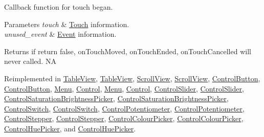 Callback function for touch began.


\begin{DoxyParams}{Parameters}
{\em touch} & \hyperlink{classTouch}{Touch} information. \\
\hline
{\em unused\+\_\+event} & \hyperlink{classEvent}{Event} information. \\
\hline
\end{DoxyParams}
\begin{DoxyReturn}{Returns}
if return false, on\+Touch\+Moved, on\+Touch\+Ended, on\+Touch\+Cancelled will never called.  NA 
\end{DoxyReturn}


Reimplemented in \hyperlink{classTableView_a57908fcd3fe592e50ff721dd84675a01}{Table\+View}, \hyperlink{classTableView_a195a00658f0ba79be1b59935569c3c7c}{Table\+View}, \hyperlink{classScrollView_a3b24de8c28e9cfd8a2f44d626266e1be}{Scroll\+View}, \hyperlink{classScrollView_a18daa7ba9b5f802e65a6df2dde10a625}{Scroll\+View}, \hyperlink{classControlButton_a170cc0df0207fba7bc352acc6173d948}{Control\+Button}, \hyperlink{classControlButton_a1f4736ab73edd357bf9caf9fa0e1dcd6}{Control\+Button}, \hyperlink{classMenu_a2492a2fef0ccf44baf794ebc7676d986}{Menu}, \hyperlink{classControl_acdbc84186be785b6e2970c93f4252b72}{Control}, \hyperlink{classMenu_aea88e7147647b3295a5453990c47f1be}{Menu}, \hyperlink{classControl_a0cf2e20cea5b57b263e965be4a19ab52}{Control}, \hyperlink{classControlSlider_a501e9da8ef3f1dacbfb9f7a12ecb2aed}{Control\+Slider}, \hyperlink{classControlSlider_a8f6fb619bb23b4e1507f1f2bb904f808}{Control\+Slider}, \hyperlink{classControlSaturationBrightnessPicker_a8660ed765c6c5c0d8856f59aa0ba34b2}{Control\+Saturation\+Brightness\+Picker}, \hyperlink{classControlSaturationBrightnessPicker_a4de153e53cccd78b56d9dc3e18411777}{Control\+Saturation\+Brightness\+Picker}, \hyperlink{classControlSwitch_aaba407c9125d0e4cc85fb5ae59ea964c}{Control\+Switch}, \hyperlink{classControlSwitch_a67af886fe24ec32313023514b28991f3}{Control\+Switch}, \hyperlink{classControlPotentiometer_a92d549b600c44bed4fd08d5ff13cbe8e}{Control\+Potentiometer}, \hyperlink{classControlPotentiometer_ae5ab22036e6a15b6a5d388db38f29bc7}{Control\+Potentiometer}, \hyperlink{classControlStepper_a7fbb969bb376da49033a5df63f562905}{Control\+Stepper}, \hyperlink{classControlStepper_a73a5572d0e9ba2a72da9f42884e621e7}{Control\+Stepper}, \hyperlink{classControlColourPicker_aec95ec2b1f58342568c73ecd208d6a12}{Control\+Colour\+Picker}, \hyperlink{classControlColourPicker_a83493e9deb3c69dd40be99009a4759d6}{Control\+Colour\+Picker}, \hyperlink{classControlHuePicker_af178753e94f91d15e613bf0c6387af5b}{Control\+Hue\+Picker}, and \hyperlink{classControlHuePicker_ae14f5994e10b93bec6b4de027902b2a1}{Control\+Hue\+Picker}.

